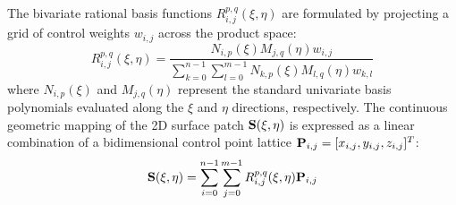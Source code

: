 The bivariate rational basis functions $R_{i,j}^{p,q}(\xi, \eta)$ are formulated by projecting a grid of control weights $w_{i,j}$ across the product space:
\begin{equation}
    R_{i,j}^{p,q}(\xi, \eta) = \frac{N_{i,p}(\xi) M_{j,q}(\eta) w_{i,j}}{\sum_{k=0}^{n-1} \sum_{l=0}^{m-1} N_{k,p}(\xi) M_{l,q}(\eta) w_{k,l}}
\end{equation}
where $N_{i,p}(\xi)$ and $M_{j,q}(\eta)$ represent the standard univariate basis polynomials evaluated along the $\xi$ and $\eta$ directions, respectively. The continuous geometric mapping of the 2D surface patch $\mathbf{S}(\xi, \eta)$ is expressed as a linear combination of a bidimensional control point lattice $\mathbf{P}_{i,j} = [x_{i,j}, y_{i,j}, z_{i,j}]^T$:
\begin{equation}
    \mathbf{S}(\xi, \eta) = \sum_{i=0}^{n-1} \sum_{j=0}^{m-1} R_{i,j}^{p,q}(\xi, \eta) \mathbf{P}_{i,j}
\end{equation}

